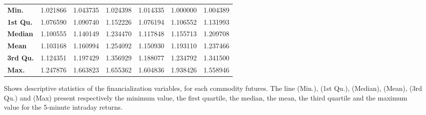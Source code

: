 \begin{landscape}
\begin{table}[]
\begin{center}
\begin{tabular}{@{}lllllll@{}}
\textbf{Min.}    & 1.021866    & 1.043735    & 1.024398    & 1.014335    & 1.000000    & 1.004389    \\
\textbf{1st Qu.} & 1.076590    & 1.090740    & 1.152226    & 1.076194    & 1.106552    & 1.131993    \\
\textbf{Median}  & 1.100555    & 1.140149    & 1.234470    & 1.117848    & 1.155713    & 1.209708    \\
\textbf{Mean}    & 1.103168    & 1.160994    & 1.254092    & 1.150930    & 1.193110    & 1.237466    \\
\textbf{3rd Qu.} & 1.124351    & 1.197429    & 1.356929    & 1.188077    & 1.234792    & 1.341500    \\
\textbf{Max.}    & 1.247876    & 1.663823    & 1.655362    & 1.604836    & 1.938426    & 1.558946    \\ \bottomrule
\end{tabular}
\end{center}
\begin{tablenotes}
        \singlespacing
        \footnotesize
Shows descriptive statistics of the financialization variables, for each commodity futures. The line (Min.), (1st Qu.), (Median), (Mean), (3rd Qu.) and (Max) present respectively the minimum value, the first quartile, the median, the mean, the third quartile and the maximum value for the 5-minute intraday returns.
\end{tablenotes}
\end{table}

\end{landscape}

